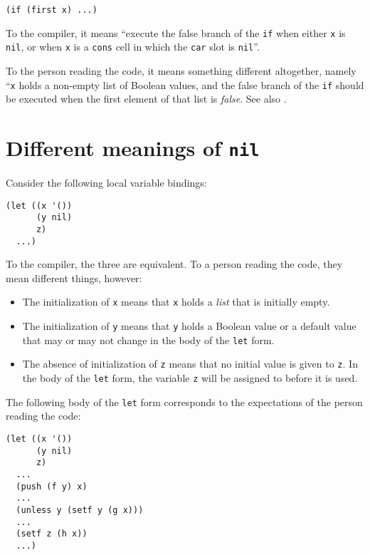 \begin{verbatim}
(if (first x) ...)
\end{verbatim}

To the compiler, it means ``execute the false branch of the \texttt{if}
when either \texttt{x} is \texttt{nil}, or when \texttt{x} is a
\texttt{cons} cell in which the \texttt{car} slot is \texttt{nil}''.

To the person reading the code, it means something different
altogether, namely ``\texttt{x} holds a non-empty list of Boolean
values, and the false branch of the \texttt{if} should be executed
when the first element of that list is
\emph{false}. See also .

\section{Different meanings of \texttt{nil}}
\label{sec-coding-style-meanings-of-nil}

Consider the following local variable bindings:

\begin{verbatim}
(let ((x '())
      (y nil)
      z)
  ...)
\end{verbatim}

To the compiler, the three are equivalent.  To a person reading the
code, they mean different things, however:

\begin{itemize}
\item The initialization of \texttt{x} means that \texttt{x} holds a
  \emph{list} that is initially empty.
\item The initialization of \texttt{y} means that \texttt{y} holds a
  Boolean value or a default value that may or may not change in the
  body of the \texttt{let} form.
\item The absence of initialization of \texttt{z} means that no
  initial value is given to \texttt{z}.  In the body of the
  \texttt{let} form, the variable \texttt{z} will be assigned to
  before it is used.
\end{itemize}

The following body of the \texttt{let} form corresponds to the
expectations of the person reading the code:

\begin{verbatim}
(let ((x '())
      (y nil)
      z)
  ...
  (push (f y) x)
  ...
  (unless y (setf y (g x)))
  ...
  (setf z (h x))
  ...)
\end{verbatim}

